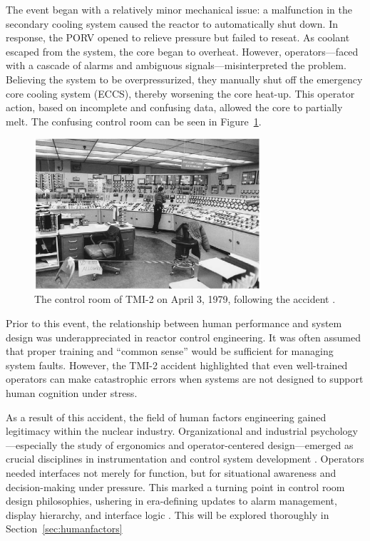 \documentclass[12pt]{article}
\begin{document}
The event began with a relatively minor mechanical issue: a malfunction in the
secondary cooling system caused the reactor to automatically shut down. In
response, the PORV opened to relieve pressure but failed to reseat. As coolant
escaped from the system, the core began to overheat. However, operators—faced
with a cascade of alarms and ambiguous signals—misinterpreted the problem.
Believing the system to be overpressurized, they manually shut off the emergency
core cooling system (ECCS), thereby worsening the core heat-up. This operator
action, based on incomplete and confusing data, allowed the core to partially
melt. The confusing control room can be seen in Figure~\ref{fig:tmicontrolroom}.

\begin{figure}[H]
  \centering
  \includegraphics[width=0.75\textwidth]{tmicontrolroom.png}
  \caption{The control room of TMI-2 on April 3, 1979, following the accident \autocite{tmiwalker}.}
  \label{fig:tmicontrolroom}
\end{figure}

Prior to this event, the relationship between human performance and system design was underappreciated in reactor control engineering. It was often assumed that proper training and “common sense” would be sufficient for managing system faults. However, the TMI-2 accident highlighted that even well-trained operators can make catastrophic errors when systems are not designed to support human cognition under stress.

As a result of this accident, the field of human factors engineering gained
legitimacy within the nuclear industry. Organizational and industrial
psychology—especially the study of ergonomics and operator-centered
design—emerged as crucial disciplines in instrumentation and control system
development \autocite{meshkati1991human}. Operators needed interfaces not merely
for function, but for situational awareness and decision-making under pressure.
This marked a turning point in control room design philosophies, ushering in
era-defining updates to alarm management, display hierarchy, and interface logic
\autocite{moderninstruments}. This will be explored thoroughly in
Section~\ref{sec:humanfactors}
\end{document}
